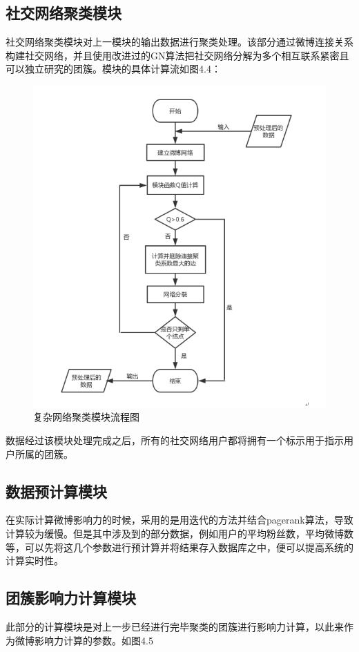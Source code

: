 \subsection{社交网络聚类模块}
社交网络聚类模块对上一模块的输出数据进行聚类处理。该部分通过微博连接关系构建社交网络，并且使用改进过的GN算法把社交网络分解为多个相互联系紧密且可以独立研究的团簇。模块的具体计算流如图4.4：
\begin{figure}[h]
	\centering
	\includegraphics[scale=0.5]{figures/6.png}
	\caption{复杂网络聚类模块流程图}
	\label{fig:1}
\end{figure}
数据经过该模块处理完成之后，所有的社交网络用户都将拥有一个标示用于指示用户所属的团簇。

\subsection{数据预计算模块}
在实际计算微博影响力的时候，采用的是用迭代的方法并结合pagerank算法，导致计算较为缓慢。但是其中涉及到的部分数据，例如用户的平均粉丝数，平均微博数等，可以先将这几个参数进行预计算并将结果存入数据库之中，便可以提高系统的计算实时性。

\subsection{团簇影响力计算模块}
此部分的计算模块是对上一步已经进行完毕聚类的团簇进行影响力计算，以此来作为微博影响力计算的参数。如图4.5

